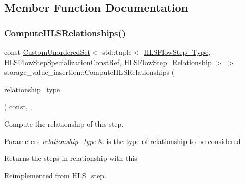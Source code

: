 \subsection{Member Function Documentation}
\mbox{\label{classstorage__value__insertion_ac5383fdac16e735bf98653499943f06f}} 
\subsubsection{\texorpdfstring{Compute\+H\+L\+S\+Relationships()}{ComputeHLSRelationships()}}
{\footnotesize\ttfamily const \hyperlink{classCustomUnorderedSet}{Custom\+Unordered\+Set}$<$ std\+::tuple$<$ \hyperlink{hls__step_8hpp_ada16bc22905016180e26fc7e39537f8d}{H\+L\+S\+Flow\+Step\+\_\+\+Type}, \hyperlink{hls__step_8hpp_a5fdd2edf290c196531d21d68e13f0e74}{H\+L\+S\+Flow\+Step\+Specialization\+Const\+Ref}, \hyperlink{hls__step_8hpp_a3ad360b9b11e6bf0683d5562a0ceb169}{H\+L\+S\+Flow\+Step\+\_\+\+Relationship} $>$ $>$ storage\+\_\+value\+\_\+insertion\+::\+Compute\+H\+L\+S\+Relationships (\begin{DoxyParamCaption}\item[{const \hyperlink{classDesignFlowStep_a723a3baf19ff2ceb77bc13e099d0b1b7}{Design\+Flow\+Step\+::\+Relationship\+Type}}]{relationship\+\_\+type }\end{DoxyParamCaption}) const\hspace{0.3cm}{\ttfamily [override]}, {\ttfamily [protected]}, {\ttfamily [virtual]}}



Compute the relationship of this step. 


\begin{DoxyParams}{Parameters}
{\em relationship\+\_\+type} & is the type of relationship to be considered \\
\hline
\end{DoxyParams}
\begin{DoxyReturn}{Returns}
the steps in relationship with this 
\end{DoxyReturn}


Reimplemented from \hyperlink{classHLS__step_aed0ce8cca9a1ef18e705fc1032ad4de5}{H\+L\+S\+\_\+step}.



